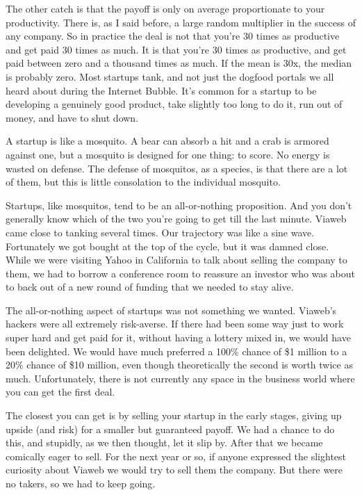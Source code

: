 The other catch is that the payoff is only on average proportionate to
your productivity. There is, as I said before, a large random multiplier
in the success of any company. So in practice the deal is not that
you're 30 times as productive and get paid 30 times as much. It is that
you're 30 times as productive, and get paid between zero and a thousand
times as much. If the mean is 30x, the median is probably zero. Most
startups tank, and not just the dogfood portals we all heard about
during the Internet Bubble. It's common for a startup to be developing a
genuinely good product, take slightly too long to do it, run out of
money, and have to shut down.

A startup is like a mosquito. A bear can absorb a hit and a crab is
armored against one, but a mosquito is designed for one thing: to score.
No energy is wasted on defense. The defense of mosquitos, as a species,
is that there are a lot of them, but this is little consolation to the
individual mosquito.

Startups, like mosquitos, tend to be an all-or-nothing proposition. And
you don't generally know which of the two you're going to get till the
last minute. Viaweb came close to tanking several times. Our trajectory
was like a sine wave. Fortunately we got bought at the top of the cycle,
but it was damned close. While we were visiting Yahoo in California to
talk about selling the company to them, we had to borrow a conference
room to reassure an investor who was about to back out of a new round of
funding that we needed to stay alive.

The all-or-nothing aspect of startups was not something we wanted.
Viaweb's hackers were all extremely risk-averse. If there had been some
way just to work super hard and get paid for it, without having a
lottery mixed in, we would have been delighted. We would have much
preferred a 100\% chance of \$1 million to a 20\% chance of \$10
million, even though theoretically the second is worth twice as much.
Unfortunately, there is not currently any space in the business world
where you can get the first deal.

The closest you can get is by selling your startup in the early stages,
giving up upside (and risk) for a smaller but guaranteed payoff. We had
a chance to do this, and stupidly, as we then thought, let it slip by.
After that we became comically eager to sell. For the next year or so,
if anyone expressed the slightest curiosity about Viaweb we would try to
sell them the company. But there were no takers, so we had to keep
going.

